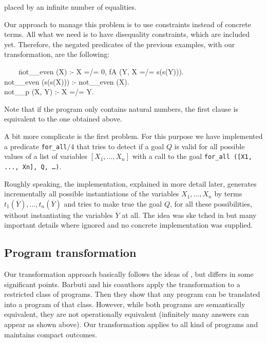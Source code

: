 \documentclass[]{llncs}
\newenvironment{mytabbing}
   {\vspace{0.3em}\begin{small}\begin{tabbing}}
   {\end{tabbing}\end{small}\vspace{0.3em}}
\begin{document}
placed by an infinite number of equalities.

Our approach to manage this problem is to use constraints
instead of concrete terms. All what we need is to have disequality
constraints, which are included yet. Therefore, the
negated predicates of the previous examples, with our transformation,
are the following:

\begin{tt}
\begin{mytabbing}
~~~~\=not\_\_even (X) :- X =/= 0, fA (Y, X =/= s(s(Y))). \\
    \>not\_\_even (s(s(X))) :- not\_\_even (X). \\
    \> not\_\_p (X, Y) :- X =/= Y.
\end{mytabbing}
\end{tt}

Note that if the program only contains natural numbers,
the first clause is equivalent to the one obtained above.

A bit more complicate is the first problem.
For this purpose we have implemented a predicate
{\tt for\_all}$/4$ that tries to detect if a goal $Q$ is
valid for all possible values of a list of variables
$[X_1, \ldots, X_n]$ with a call to the goal \linebreak
{\tt for\_all ([X1, ..., Xn], Q, \ldots)}.

Roughly speaking, the implementation, explained
in more detail later, generates incrementally all possible
instantiations of the variables
$X_1, \ldots, X_n$ by terms $t_1(\overline{Y}), \ldots, t_n(\overline{Y})$
and tries to make true the goal $Q$, for all these possibilities, 
without instantiating the variables $\overline{Y}$ at all. The idea was ske
tched in \cite{Barbuti2} but
many important details where ignored and no concrete implementation
was supplied.

\subsection{Program transformation}

Our transformation approach basically follows the ideas of 
\cite{Barbuti2}, but
differs in some significant points. Barbuti and his coauthors 
apply the transformation to a
restricted class of programs. Then they show that any program
can be translated into a program of that class. However, while
both programs are semantically equivalent, they are not operationally
equivalent (infinitely many answers can appear as shown above). 
Our transformation 
applies to all kind of programs and maintains compact outcomes.
\end{document}
